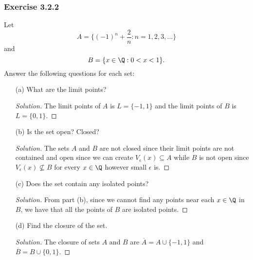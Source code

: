 \subsubsection{Exercise 3.2.2} Let 
\[ A = \Big\{ (-1)^n + \frac{ 2 }{ n } : n = 1,2,3,... \Big\}   \]
and
\[ B = \{ x \in \Q : 0 < x < 1 \}.  \]
Answer the following questions for each set:
\begin{enumerate}
    \item[(a)] What are the limit points? 
        \begin{proof}[Solution]
        The limit points of \( A \) is \( L = \{ -1, 1  \}  \) and the limit points of \( B \) is \( L = \{ 0,1 \}  \).
        \end{proof}
    \item[(b)] Is the set open? Closed? 
        \begin{proof}[Solution]
            The sets \( A  \) and \( B \) are not closed since their limit points are not contained and open since we can create \( V_{\epsilon }(x) \subseteq A \) while \( B \) is not open since \( V_{\epsilon }(x) \not \subseteq B \) for every \( x \in \Q \) however small \( \epsilon  \) is.  
        \end{proof}
    \item[(c)] Does the set contain any isolated points? 
        \begin{proof}[Solution]
        From part (b), since we cannot find any points near each \( x \in \Q  \) in \( B \), we have that all the points of \( B  \) are isolated points. 
        \end{proof}
    \item[(d)] Find the closure of the set.
        \begin{proof}[Solution]
            The closure of sets \( A \) and \( B \) are \( \overline{A} = A \cup \{-1,1\}   \) and \( \overline{B} = B \cup \{ 0,1 \}  \). 
        \end{proof}
\end{enumerate}




